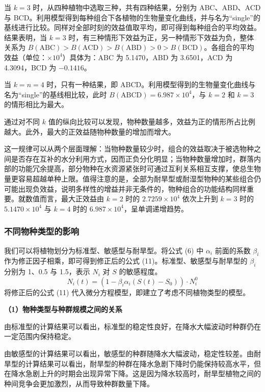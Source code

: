 \documentclass[11pt,a4paper]{ctexart}
\begin{document}
当 $k=3$ 时，从四种植物中选取三种，共有四种结果，分别为 ABC、ABD、ACD 与 BCD。利用模型得到每种组合下各植物的生物量变化曲线，并与名为“single”的基线进行比较。同样对全部时刻的效益值取平均，即可得到每种组合的平均效益。结果表明，当 $k=3$ 时，有三种情形下效益为正，另一种情形下效益为负，整体关系为 $B(\mathrm{ABC})>B(\mathrm{ACD})>B(\mathrm{ABD})>0>B(\mathrm{BCD})$。各组合的平均效益（单位：$\times10^{4}$）具体为：ABC 为 5.1470，ABD 为 3.6501，ACD 为 4.3094，BCD 为 $-0.1416$。

当 $k=n=4$ 时，只有一种结果，即 ABCD。利用模型得到的生物量变化曲线与名为“single”的基线相比较，此时 $B(\mathrm{ABCD})=6.987\times10^{4}$，与 $k=2$ 和 $k=3$ 的情形相比为最大。

通过对不同 $k$ 值的纵向比较可以发现，物种数量越多，效益为正的情形所占比例越大。此外，最大的正效益随物种数量的增加而增大。

这一规律可以从两个层面理解：当物种数量较少时，组合的效益取决于被选物种之间是否存在互补的水分利用方式，因而正负分化明显；当物种数量增加时，群落内部的功能冗余提高，部分物种在水资源紧张时可通过互利关系相互支撑，使总生物量更容易超越单种上限。值得注意的是，全部为耐旱型或耐湿型物种的某些组合仍可能出现负效益，说明多样性的增益并非无条件的，物种组合的功能结构同样重要。就数值而言，最大正效益由 $k=2$ 时的 $2.7259\times10^{4}$ 依次上升到 $k=3$ 时的 $5.1470\times10^{4}$ 与 $k=4$ 时的 $6.987\times10^{4}$，呈单调递增趋势。

\subsubsection{不同物种类型的影响}

我们可以将植物划分为标准型、敏感型与耐旱型。将公式 (6) 中 $\alpha_i$ 前面的系数 $\beta_i$ 作为修正因子相乘，即可得到修正后的公式 (11)。标准型、敏感型与耐旱型的 $\beta_i$ 分别为 1、0.5 与 1.5，表示 $N_i$ 对 $S$ 的敏感程度。
\begin{equation}
N_i(t)=\left(1-\beta_i\alpha_i\left(S(t)-S_0\right)\right)\cdot N_i^{0}
\end{equation}
将修正后的公式 (11) 代入微分方程模型，即建立了考虑不同植物类型的模型。

\textbf{（1）物种类型与种群规模之间的关系}

由标准型的计算结果可以看出，标准型的稳定性良好，在降水大幅波动时种群仍在一定范围内保持稳定。

由敏感型的计算结果可以看出，敏感型的种群随降水大幅波动，稳定性较差。由耐旱型的计算结果可以看出，耐旱型的种群在降水急剧下降时仍能保持较高水平，但在降水急剧上升的时期会出现异常下降。这是因为降水较高时，耐旱型植物之间的种间竞争会更加激烈，从而导致种群数量下降。
\end{document}
